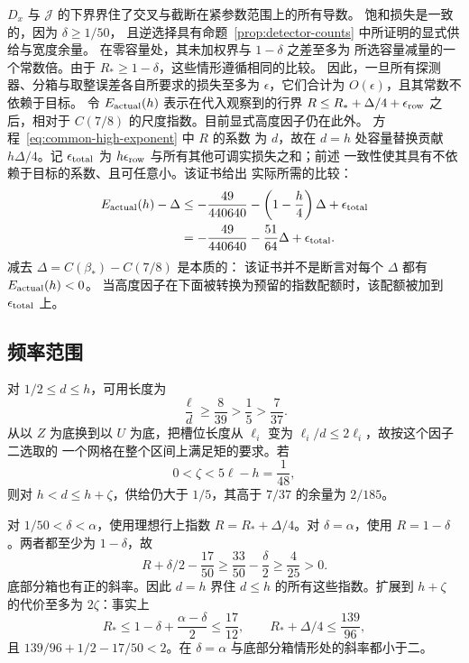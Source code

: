 \documentclass[11pt,a4paper]{article}
\numberwithin{equation}{section}
\numberwithin{figure}{section}
\theoremstyle{definition}
\theoremstyle{remark}
\begin{document}
\(D_x\) 与 \(\mathcal J\) 的下界界住了交叉与截断在紧参数范围上的所有导数。
饱和损失是一致的，因为 \(\delta\ge1/50\)，
且逆选择具有命题~\ref{prop:detector-counts} 中所证明的显式供给与宽度余量。
在零容量处，其未加权界与 \(1-\delta\) 之差至多为
所选容量减量的一个常数倍。由于
\(R_*\ge1-\delta\)，这些情形遵循相同的比较。
因此，一旦所有探测器、分箱与取整误差各自所要求的损失至多为
\(\epsilon\)，它们合计为 \(O(\epsilon)\)，且其常数不依赖于目标。
令 \(E_{\rm actual}(h)\) 表示在代入观察到的行界
\(R\le R_*+\Delta/4+\epsilon_{\rm row}\) 之后，相对于
\(C(7/8)\) 的尺度指数。目前显式高度因子仍在此外。
方程~\eqref{eq:common-high-exponent} 中 \(R\) 的系数
为 \(d\)，故在 \(d=h\) 处容量替换贡献
\(h\Delta/4\)。记 \(\epsilon_{\rm total}\) 为
\(h\epsilon_{\rm row}\) 与所有其他可调实损失之和；前述
一致性使其具有不依赖于目标的系数、且可任意小。该证书给出
实际所需的比较：
\begin{equation}
 \begin{split}
 E_{\rm actual}(h)-\Delta
 &\le-\frac{49}{440640}-\left(1-\frac h4\right)\Delta
       +\epsilon_{\rm total}\\
 &=-\frac{49}{440640}-\frac{51}{64}\Delta
       +\epsilon_{\rm total}.
 \end{split}
 \label{eq:adaptive-endpoint}
\end{equation}
减去 \(\Delta=C(\beta_*)-C(7/8)\) 是本质的：
该证书并不是断言对每个 \(\Delta\) 都有 \(E_{\rm actual}(h)<0\)。
当高度因子在下面被转换为预留的指数配额时，该配额被加到
\(\epsilon_{\rm total}\) 上。

\subsection{频率范围}

对 \(1/2\le d\le h\)，可用长度为
\[
 \frac{\ell}{d}\ge\frac8{39}>\frac15>\frac7{37}.
\]
从以 \(Z\) 为底换到以 \(U\) 为底，把槽位长度从
\(\ell_i\) 变为 \(\ell_i/d\le2\ell_i\)，故按这个因子二选取的
一个网格在整个区间上满足矩的要求。若
\[
 0<\zeta<5\ell-h=\frac1{48},
\]
则对 \(h<d\le h+\zeta\)，供给仍大于
\(1/5\)，其高于 \(7/37\) 的余量为 \(2/185\)。

对 \(1/50<\delta<\alpha\)，使用理想行上指数
\(R=R_*+\Delta/4\)。对 \(\delta=\alpha\)，使用
\(R=1-\delta\)。两者都至少为 \(1-\delta\)，故
\[
 R+\delta/2-\frac{17}{50}
 \ge\frac{33}{50}-\frac{\delta}{2}\ge\frac4{25}>0.
\]
底部分箱也有正的斜率。因此 \(d=h\) 界住
\(d\le h\) 的所有这些指数。扩展到
\(h+\zeta\) 的代价至多为 \(2\zeta\)：事实上
\[
 R_*\le1-\delta+\frac{\alpha-\delta}{2}\le\frac{17}{12},
 \qquad
 R_*+\Delta/4\le\frac{139}{96},
\]
且 \(139/96+1/2-17/50<2\)。在 \(\delta=\alpha\)
与底部分箱情形处的斜率都小于二。
\end{document}
